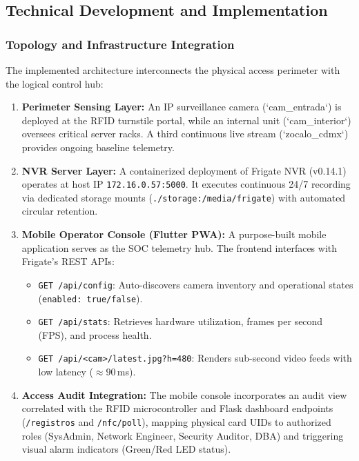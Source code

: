 \subsection{Technical Development and Implementation}

\subsubsection{Topology and Infrastructure Integration}
The implemented architecture interconnects the physical access perimeter with the logical control hub:
\begin{enumerate}
    \item \textbf{Perimeter Sensing Layer:} An IP surveillance camera (`cam_entrada`) is deployed at the RFID turnstile portal, while an internal unit (`cam_interior`) oversees critical server racks. A third continuous live stream (`zocalo_cdmx`) provides ongoing baseline telemetry.
    \item \textbf{NVR Server Layer:} A containerized deployment of Frigate NVR (v0.14.1) operates at host IP \texttt{172.16.0.57:5000}. It executes continuous 24/7 recording via dedicated storage mounts (\texttt{./storage:/media/frigate}) with automated circular retention.
    \item \textbf{Mobile Operator Console (Flutter PWA):} A purpose-built mobile application serves as the SOC telemetry hub. The frontend interfaces with Frigate's REST APIs:
    \begin{itemize}
        \item \texttt{GET /api/config}: Auto-discovers camera inventory and operational states (\texttt{enabled: true/false}).
        \item \texttt{GET /api/stats}: Retrieves hardware utilization, frames per second (FPS), and process health.
        \item \texttt{GET /api/<cam>/latest.jpg?h=480}: Renders sub-second video feeds with low latency ($\approx 90$\,ms).
    \end{itemize}
    \item \textbf{Access Audit Integration:} The mobile console incorporates an audit view correlated with the RFID microcontroller and Flask dashboard endpoints (\texttt{/registros} and \texttt{/nfc/poll}), mapping physical card UIDs to authorized roles (SysAdmin, Network Engineer, Security Auditor, DBA) and triggering visual alarm indicators (Green/Red LED status).
\end{enumerate}

